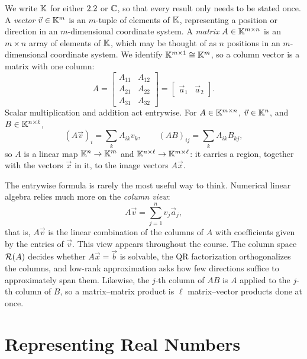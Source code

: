 We write $\mathbb{K}$ for either $2.2$ or $\mathbb{C}$, so that every result only needs to be stated once. A \emph{vector} $\vec{v} \in \mathbb{K}^m$ is an $m$-tuple of elements of $\mathbb{K}$, representing a position or direction in an $m$-dimensional coordinate system. A \emph{matrix} $A \in \mathbb{K}^{m \times n}$ is an $m \times n$ array of elements of $\mathbb{K}$, which may be thought of as $n$ positions in an $m$-dimensional coordinate system. We identify $\mathbb{K}^{m \times 1} \cong \mathbb{K}^m$, so a column vector is a matrix with one column:
\begin{equation}
  A = \begin{bmatrix} A_{11} & A_{12} \\ A_{21} & A_{22} \\ A_{31} & A_{32} \end{bmatrix} = \begin{bmatrix} \vec{a}_1 & \vec{a}_2 \end{bmatrix}.
\end{equation}
Scalar multiplication and addition act entrywise. For $A \in \mathbb{K}^{m \times n}$, $\vec{v} \in \mathbb{K}^n$, and $B \in \mathbb{K}^{n \times \ell}$,
\begin{equation}
  (A\vec{v})_i = \sum_{k} A_{ik} v_k, \qquad (AB)_{ij} = \sum_k A_{ik} B_{kj},
\end{equation}
so $A$ is a linear map $\mathbb{K}^n \to \mathbb{K}^m$ and $\mathbb{K}^{n \times \ell} \to \mathbb{K}^{m \times \ell}$: it carries a region, together with the vectors $\vec{x}$ in it, to the image vectors $A\vec{x}$.

The entrywise formula is rarely the most useful way to think. Numerical linear algebra relies much more on the \emph{column view}:
\begin{equation}
  A\vec{v} = \sum_{j=1}^{n} v_j \vec{a}_j,
\end{equation}
that is, $A\vec{v}$ is the linear combination of the columns of $A$ with coefficients given by the entries of $\vec{v}$. This view appears throughout the course. The column space $\mathcal{R}(A)$ decides whether $A\vec{x} = \vec{b}$ is solvable, the QR factorization orthogonalizes the columns, and low-rank approximation asks how few directions suffice to approximately span them. Likewise, the $j$-th column of $AB$ is $A$ applied to the $j$-th column of $B$, so a matrix--matrix product is $\ell$ matrix--vector products done at once.

\section{Representing Real Numbers}
\label{sec:repr}

